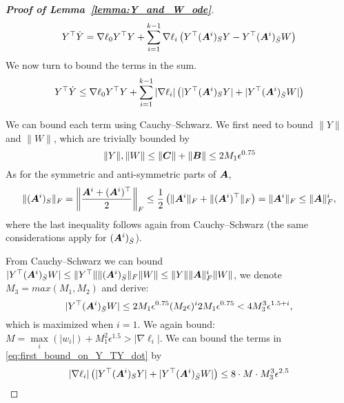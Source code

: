 \begin{proof}[\textbf{Proof of Lemma~\ref{lemma:Y_and_W_ode}}]
\begin{equation}
    Y^\top\dot{Y} = \nabla\ell_0 Y^\top Y +\sum_{i=1}^{k-1}\nabla\ell_i\left(Y^\top({\bm{A}}^i)_SY - Y^\top({\bm{A}}^i)_{\bar{S}}W\right)
\end{equation}
We now turn to bound the terms in the sum. 
\begin{equation}\label{eq:first_bound_on_Y_TY_dot}
    Y^\top\dot{Y} \le \nabla\ell_0 Y^\top Y +\sum_{i=1}^{k-1}|\nabla\ell_i|\left(|Y^\top({\bm{A}}^i)_SY| + |Y^\top({\bm{A}}^i)_{\bar{S}}W|\right)
\end{equation}

We can bound each term using Cauchy–Schwarz. We first need to bound $\|Y\|$ and $\|W\|$, which are trivially bounded by 
\begin{equation}
    \|Y\|,\|W\|\le \|{\bm{C}}\|+\|{\bm{B}}\|\le 2M_1\epsilon^{0.75}
\end{equation}
As for the symmetric and anti-symmetric parts of ${\bm{A}}$,
\begin{equation}\label{eq:bound_singular_of_A_sym_and_asym}
    \|({\bm{A}}^i)_S\|_F=\left\|\frac{{\bm{A}}^i+({\bm{A}}^i)^\top}{2}\right\|_F \le \frac{1}{2}\left(\|{\bm{A}}^i\|_F+\|({\bm{A}}^i)^\top\|_F\right)=\|{\bm{A}}^i\|_F\le \|{\bm{A}}\|_F^i,
\end{equation}
where the last inequality follows again from Cauchy–Schwarz (the same considerations apply for $({\bm{A}}^i)_{\bar{S}}$).

From Cauchy–Schwarz we can bound $|Y^\top({\bm{A}}^i)_{\bar{S}}W|\le \|Y^\top\|\|({\bm{A}}^i)_{\bar{S}}\|_F\|W\| \le \|Y\|\|{\bm{A}}\|_F^i\|W\|$, we denote $M_3 = max(M_1, M_2)$ and derive:
\begin{equation}\label{eq:cauchy_schwarz_bound}
    |Y^\top({\bm{A}}^i)_{\bar{S}}W| \le 2M_1\epsilon^{0.75}(M_2\epsilon)^i2M_1\epsilon^{0.75}< 4M_3^3 \epsilon^{1.5+i},
\end{equation}
%
which is maximized when $i=1$. We again bound:
$M = \underset{i}{\max}(|w_i|)+M_1^2\epsilon^{1.5}>|\nabla \ell_i|$. We can bound the terms in \eqref{eq:first_bound_on_Y_TY_dot} by 
\begin{equation}
    |\nabla\ell_i|\left(|Y^\top({\bm{A}}^i)_SY| + |Y^\top({\bm{A}}^i)_{\bar{S}}W|\right)\le 8\cdot M \cdot  M_3^3\epsilon^{2.5}
\end{equation}


\end{proof}
